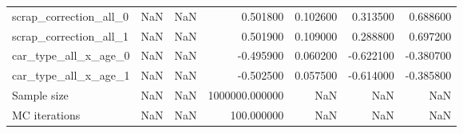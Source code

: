 \begin{tabular}{lrlrrrr}
scrap_correction_all_0 & NaN & NaN & 0.501800 & 0.102600 & 0.313500 & 0.688600 \\
scrap_correction_all_1 & NaN & NaN & 0.501900 & 0.109000 & 0.288800 & 0.697200 \\
car_type_all_x_age_0 & NaN & NaN & -0.495900 & 0.060200 & -0.622100 & -0.380700 \\
car_type_all_x_age_1 & NaN & NaN & -0.502500 & 0.057500 & -0.614000 & -0.385800 \\
Sample size & NaN & NaN & 1000000.000000 & NaN & NaN & NaN \\
MC iterations & NaN & NaN & 100.000000 & NaN & NaN & NaN \\
\bottomrule
\end{tabular}
